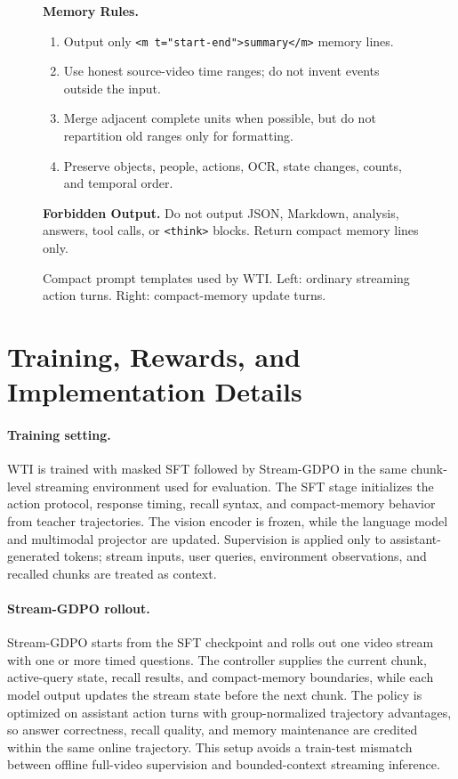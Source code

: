 \begin{figure}[t]
\begin{minipage}[t]{0.48\textwidth}
\begin{tcolorbox}
  \medskip
  \noindent\textbf{Memory Rules.}
  \begin{enumerate}[leftmargin=*, noitemsep, topsep=2pt]
    \item Output only \texttt{<m t="start-end">summary</m>} memory lines.
    \item Use honest source-video time ranges; do not invent events outside the input.
    \item Merge adjacent complete units when possible, but do not repartition old ranges only for formatting.
    \item Preserve objects, people, actions, OCR, state changes, counts, and temporal order.
  \end{enumerate}

  \medskip
  \noindent\textbf{Forbidden Output.}
  Do not output JSON, Markdown, analysis, answers, tool calls, or \texttt{<think>} blocks.
  Return compact memory lines only.
  \end{tcolorbox}
  \end{minipage}
  \caption{Compact prompt templates used by WTI. Left: ordinary streaming action turns. Right: compact-memory update turns.}
  \label{fig:streaming_prompt_templates}
\end{figure}

\section{Training, Rewards, and Implementation Details}
\label{app:implementation}

\paragraph{Training setting.}
WTI is trained with masked SFT followed by Stream-GDPO in the same chunk-level streaming environment used for evaluation.
The SFT stage initializes the action protocol, response timing, recall syntax, and compact-memory behavior from teacher trajectories.
The vision encoder is frozen, while the language model and multimodal projector are updated.
Supervision is applied only to assistant-generated tokens; stream inputs, user queries, environment observations, and recalled chunks are treated as context.

\paragraph{Stream-GDPO rollout.}
Stream-GDPO starts from the SFT checkpoint and rolls out one video stream with one or more timed questions.
The controller supplies the current chunk, active-query state, recall results, and compact-memory boundaries, while each model output updates the stream state before the next chunk.
The policy is optimized on assistant action turns with group-normalized trajectory advantages, so answer correctness, recall quality, and memory maintenance are credited within the same online trajectory.
This setup avoids a train-test mismatch between offline full-video supervision and bounded-context streaming inference.

